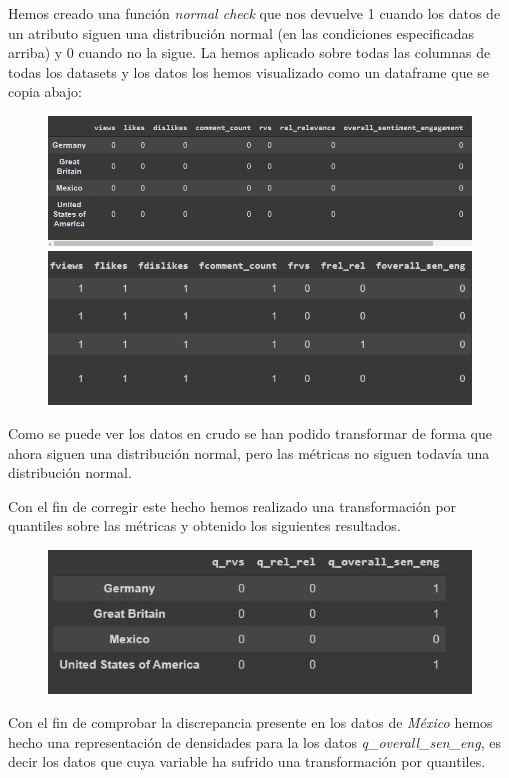 \documentclass[a4paper,12pt]{article}
\begin{document}
Hemos creado una funci\'on {\itshape normal check} que nos devuelve 1 cuando los datos de un atributo siguen una distribuci\'on normal (en las condiciones especificadas arriba) y 0 cuando no la sigue. La hemos aplicado sobre todas las columnas de todas los datasets y los datos los hemos visualizado como un dataframe que se copia abajo:

\begin{figure}
\centering
\includegraphics[width=12cm]{dataframe_1.JPG}
\includegraphics[width=12cm]{dataframe_2.JPG}
\end{figure}
 
Como se puede ver los datos en crudo se han podido transformar de forma que ahora siguen una distribuci\'on normal, pero las m\'etricas no siguen todav\'ia una distribuci\'on normal.

Con el fin de corregir este hecho hemos realizado una transformaci\'on por quantiles sobre las m\'etricas  y obtenido los siguientes resultados.

\begin{figure}[h!]
\centering
\includegraphics[width=12cm]{dataframe_3.JPG}
\end{figure}

Con el fin de comprobar la discrepancia presente en los datos de {\itshape M\'exico} hemos hecho una representaci\'on de densidades para la los datos {\itshape q\_overall\_sen\_eng}, es decir los datos que cuya variable  ha sufrido una transformaci\'on por quantiles.
\end{document}
